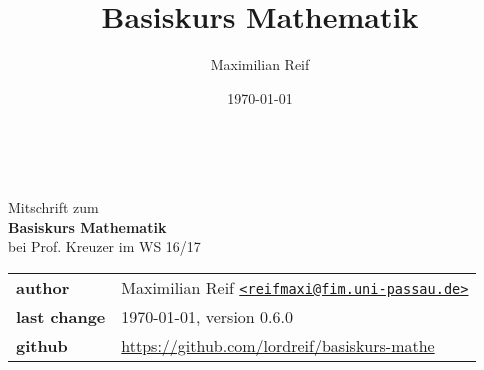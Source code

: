 \documentclass[11pt,a4paper,ngerman]{article}
\date{\today}
\author{Maximilian Reif}
\title{Basiskurs Mathematik}
\begin{document}
\begin{titlepage}
    \ \newline\newline\newline\newline\newline
	\begin{center}
		\huge Mitschrift zum \\
		\Huge \textbf{Basiskurs Mathematik} \\
		\huge bei Prof. Kreuzer im WS 16/17 \\
		\normalsize

		\vspace{1cm}
		\begin{tabular}[b]{l|l}
			\textbf{author} & Maximilian Reif \texttt{\href{mailto:reifmaxi@fim.uni-passau.de}
			{<reifmaxi@fim.uni-passau.de>}} \\
			\textbf{last change} & \today, version 0.6.0 \\
			\textbf{github} & \url{https://github.com/lordreif/basiskurs-mathe}
		\end{tabular}

		\vspace{1cm}
		
	\end{center}
   
	
\end{titlepage}

\setcounter{page}{2}

\newpage
\tableofcontents \thispagestyle{empty}
\newpage







%
%
%
%
%
\setcounter{section}{11}

\end{document}
